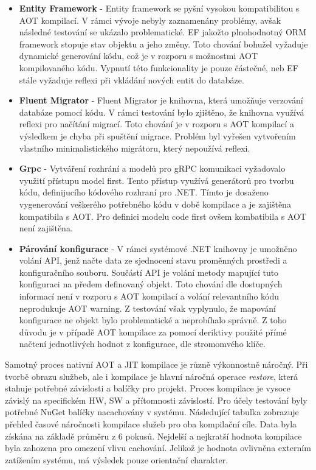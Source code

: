 \begin{itemize}
  \item \textbf{Entity Framework} - Entity framework se pyšní vysokou kompatibilitou s AOT kompilací. V rámci vývoje nebyly zaznamenány problémy, avšak následné testování se ukázalo problematické. EF jakožto plnohodnotný ORM framework stopuje stav objektu a jeho změny. Toto chování bohužel vyžaduje dynamické generování kódu, což je v rozporu s možnostmi AOT kompilovaného kódu. Vypnutí této funkcionality je pouze částečné, neb EF stále vyžaduje reflexi při vkládání nových entit do databáze.
  \item \textbf{Fluent Migrator} - Fluent Migrator je knihovna, která umožňuje verzování databáze pomocí kódu. V rámci testování bylo zjištěno, že knihovna využívá reflexi pro načítání migrací. Toto chování je v rozporu s AOT kompilací a výsledkem je chyba při spuštění migrace. Problém byl vyřešen vytvořením vlastního minimalistického migrátoru, který nepoužívá reflexi.
  \item \textbf{Grpc} - Vytváření rozhrání a modelů pro gRPC komunikaci vyžadovalo využití přístupu model first. Tento přístup využívá generátorů pro tvorbu kódu, definijucího kódového rozhraní pro .NET. Tímto je dosaženo vygenerování veškerého potřebného kódu v době kompilace a je zajištěna kompatibila s AOT. Pro definici modelu code first ovšem kombatibila s AOT není zajištěna.
  \item \textbf{Párování konfigurace} - V rámci systémové .NET knihovny je umožněno volání API, jenž načte data ze sjednocení stavu proměnných prostředi a konfiguračního souboru. Součástí API je volání metody mapující tuto konfiguraci na předem definovaný objekt. Toto chování dle dostupných informací není v rozporu s AOT kompilací a volání relevantního kódu neprodukuje AOT warning. Z testování však vyplynulo, že mapování konfigurace ne objekt bylo problematické a neprobíhalo správně. Z toho důvodu je v případě AOT kompilace za pomocí deriktivy použité přímé načtení jednotlivých hodnot z konfigurace, dle stromomvého klíče.
\end{itemize}


Samotný proces nativní AOT a JIT kompilace je různě výkonnostně náročný. Při tvorbě obrazu službeb, ale i kompilace je hlavní náročná operace \emph{restore}, která stahuje potřebné závislosti a balíčky pro projekt. Proces kompilace je vysoce závislý na specifickém HW, SW a přítomnosti závislostí. Pro účely testování byly potřebné NuGet balíčky nacachovány v systému. Následující tabulka zobrazuje přehled časové náročnosti kompilace služeb pro oba kompilační cíle. Data byla získána na základě průměru z 6 pokusů. Nejdelší a nejkratší hodnota kompilace byla zahozena pro omezení vlivu cachování. Jelikož je hodnota ovlivněna externím zatížením systému, má výsledek pouze orientační charakter.

